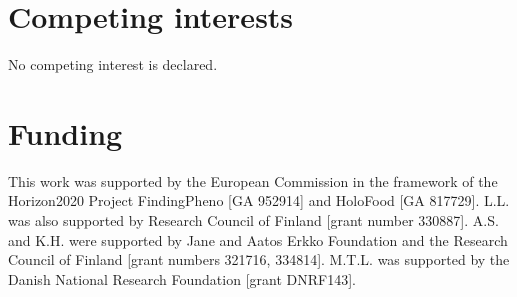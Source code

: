 \documentclass[unnumsec,webpdf,namedate,modern,large]{oup-authoring-template}%
\begin{document}
\section{Competing interests}
No competing interest is declared.

\section{Funding}
This work was supported by the European Commission in the framework of the Horizon2020 Project FindingPheno [GA  952914] and HoloFood [GA 817729]. L.L. was also supported by Research Council of Finland [grant number 330887]. A.S. and K.H. were  supported by Jane and Aatos Erkko Foundation and the Research Council of Finland [grant numbers 321716, 334814]. M.T.L. was supported by the Danish National Research Foundation [grant DNRF143].

\printbibliography
\end{document}
